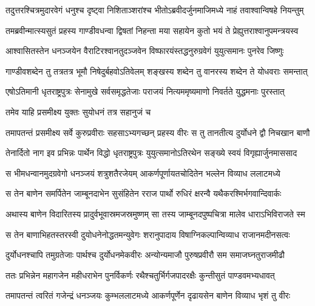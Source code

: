 
\twolineshloka
{तदुत्तरश्चित्रमुदारवेगं धनुश्च दृष्ट्वा निशिताञ्शरांश्च}
{भीतोऽब्रवीदर्जुनमाजिमध्ये नाहं तवाश्वान्विषहे नियन्तुम्}


\twolineshloka
{तमब्रवीन्मात्स्यसुतं प्रहस्य गाण्डीवधन्वा द्विषतां निहन्ता}
{मया सहायेन कुतो भयं ते प्रेह्युत्तराश्वानुपमन्त्रयस्व}


\twolineshloka
{आश्वासितस्तेन धनञ्जयेन वैराटिरश्वानतुदञ्जवेन}
{विष्फारयंस्तद्धनुरुग्रवेगं युयुत्समानः पुनरेव जिष्णुः}


\twolineshloka
{गाण्डीवशब्देन तु तत्रतत्र भूमौ निषेदुर्बहवोऽतिवेलम्}
{शङ्खस्य शब्देन तु वानरस्य शब्देन ते योधवराः समन्तात्}




\twolineshloka
{एषोऽतिमानी धृतराष्ट्रपुत्रः सेनामुखे सर्वसमृद्धतेजाः}
{पराजयं नित्यममृष्यमाणो निवर्तते युद्धमनाः पुरस्तात्}


\onelineshloka
{तमेव याहि प्रसमीक्ष्य युक्तः सुयोधनं तत्र सहानुजं च}



\twolineshloka
{तमापतन्तं प्रसमीक्ष्य सर्वे कुरुप्रवीराः सहसाऽभ्यगच्छन्}
{प्रहस्य वीरः स तु तानतीत्य दुर्योधने द्वौ निचखान बाणौ}


\twolineshloka
{तेनार्दितो नाग इव प्रभिन्नः पार्थेन विद्धो धृतराष्ट्रपुत्रः}
{युयुत्समानोऽतिरथेन सङ्ख्ये स्वयं विगृह्यार्जुनमाससाद}


\twolineshloka
{स भीमधन्वानमुदग्रवेगो धनञ्जयं शत्रुशतैरजेयम्}
{आकर्णपूर्णायतचोदितेन भल्लेन विव्याध ललाटमध्ये}


\twolineshloka
{स तेन बाणेन समर्पितेन जाम्बूनदाभेन सुसंहितेन}
{रराज पार्थो रुधिरं क्षरन्वै यथैकरश्मिर्भगवान्दिवार्कः}


\twolineshloka
{अथास्य बाणेन विदारितस्य प्रादुर्वभूवास्रमजस्रमुष्णम्}
{सा तस्य जाम्बूनदपुष्पचित्रा मालेव धाराऽभिविराजते स्म}


\twolineshloka
{स तेन बाणाभिहतस्तरस्वी दुयोधनेनोद्धतमन्युवेगः}
{शरानुपादाय विषाग्निकल्पान्विव्याध राजानमदीनसत्वः}


\twolineshloka
{दुर्योधनश्चापि तमुग्रतेजाः पार्थश्च दुर्योधनमेकवीरः}
{अन्योन्यमाजौ पुरुषप्रवीरौ सम समाजघ्नतुराजमीढौ}


\twolineshloka
{ततः प्रभिन्नेन महागजेन महीधराभेन पुनर्विकर्णः}
{रथैश्चतुर्भिर्गजपादरक्षैः कुन्तीसुतं पाण्डवमभ्यधावत्}


\twolineshloka
{तमापतन्तं त्वरितं गजेन्द्रं धनञ्जयः कुम्भललाटमध्ये}
{आकर्णपूर्णेन दृढायसेन बाणेन विव्याध भृशं तु वीरः}


